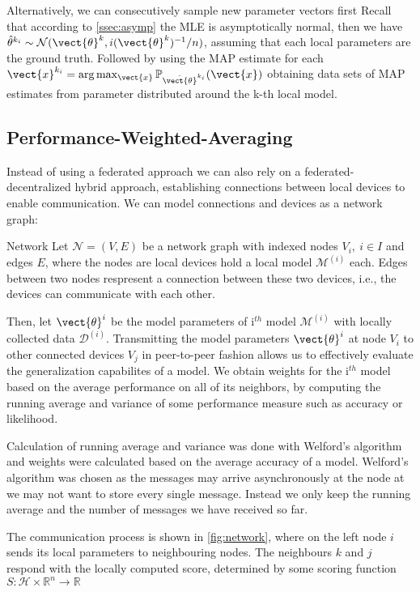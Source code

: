 Alternatively, we can consecutively sample new parameter vectors first
Recall that according to \ref{ssec:asymp} the MLE is asymptotically normal, then we have $\hat{\theta}^{k_i}  \sim \mathcal{N}(\vect{\theta}^k, i(\vect{\theta}^k)^{-1}/n)$, assuming that each local parameters are the ground truth.
Followed by using the MAP estimate for each $\vect{x}^{k_i} = \arg\max_{\vect{x}} \mathbb{P}_{\hat{\vect{\theta}}^{k_i}}(\vect{x})$ obtaining data sets of MAP estimates from parameter distributed around the k-th local model.
\subsection{Performance-Weighted-Averaging}

Instead of using a federated approach we can also rely on a federated-decentralized hybrid approach, establishing connections between local devices to enable communication.
We can model connections and devices as a network graph:
\begin{definition}{Network}
    Let $\mathcal{N} = (V, E)$ be a network graph with indexed nodes $V_i, \: i \in I$ and edges $E$, where the nodes are local devices hold a local model $\mathcal{M}^{(i)}$ each.
    Edges between two nodes respresent a connection between these two devices, i.e., the devices can communicate with each other.
\end{definition}

Then, let $\vect{\theta}^{i}$ be the model parameters of i$^{th}$ model $\mathcal{M}^{(i)}$ with locally collected data $\mathcal{D}^{(i)}$.
Transmitting the model parameters $\vect{\theta}^{i}$  at node $V_i$  to other connected devices  $V_j$ in peer-to-peer fashion allows us to effectively evaluate the generalization capabilites of a model.
We obtain weights for the i$^{th}$ model based on the average performance on all of its neighbors, by computing the running average and variance of some performance measure such as accuracy or likelihood.

Calculation of running average and variance was done with Welford's algorithm and weights were calculated based on the average accuracy of a model.
Welford's algorithm was chosen as the messages may arrive asynchronously at the node at we may not want to store every single message.
Instead we only keep the running average and the number of messages we have received so far.

The communication process is shown in \fig \ref{fig:network}, where on the left node $i$ sends its local parameters to neighbouring nodes. The neighbours $k$ and $j$ respond with the locally computed score, determined by some scoring function $S: \mathcal{H} \times \mathbb{R}^n \rightarrow \mathbb{R}$


